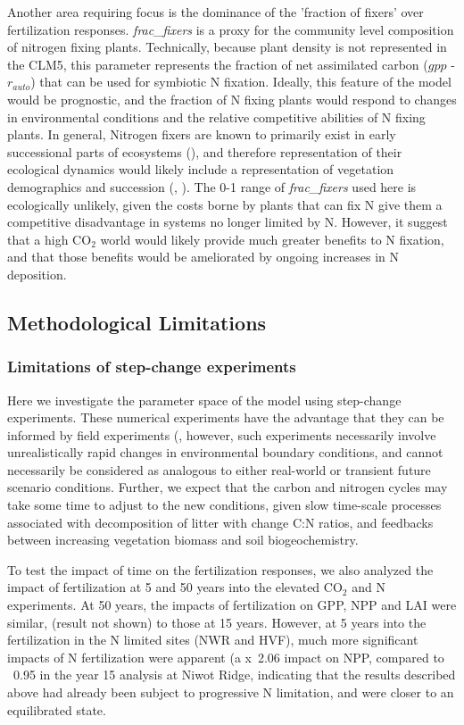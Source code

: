 \usepackage{}\documentclass[draft,linenumbers]{agujournal}
\begin{document}
Another area requiring focus is the dominance of the 'fraction of fixers' over fertilization responses. \emph{frac\_fixers} is a proxy for the community level composition of nitrogen fixing plants. Technically, because plant density is not represented in the CLM5, this parameter represents the fraction of net assimilated carbon ($gpp$ - $r_{auto}$) that can be used for symbiotic N fixation. Ideally, this feature of the model would be prognostic, and the fraction of N fixing plants would respond to changes in environmental conditions and the relative competitive abilities of N fixing plants. In general, Nitrogen fixers are known to primarily exist in early successional parts of ecosystems (\cite{vitousek1989}), and therefore representation of their ecological dynamics would likely include a representation of vegetation demographics and succession (\cite{fisher2018vegetation}, \cite{trugman2016climate}). The 0-1 range of \emph{frac\_fixers} used here is ecologically unlikely, given the costs borne by plants that can fix N give them a competitive disadvantage in systems no longer limited by N. However, it suggest that a high CO$_{2}$ world would likely provide much greater benefits to N fixation, and that those benefits would be ameliorated by ongoing increases in N deposition.

\subsection{ Methodological Limitations}
\subsubsection{Limitations of step-change experiments}
Here we investigate the parameter space of the model using step-change experiments. These numerical experiments have the advantage that they can be informed by field experiments (\cite{wieder2019}, however, such experiments necessarily involve unrealistically rapid changes in environmental boundary conditions, and cannot necessarily be considered as analogous to either real-world or transient future scenario conditions. Further, we expect that the carbon and nitrogen cycles may take some time to adjust to the new conditions, given slow time-scale processes associated with decomposition of litter with change C:N ratios, and feedbacks between increasing vegetation biomass and soil biogeochemistry.

To test the impact of time on the fertilization responses, we also analyzed the impact of fertilization at 5 and 50 years into the elevated CO$_{2}$ and N experiments. At 50 years, the impacts of fertilization on GPP, NPP and LAI were similar, (result not shown) to those at 15 years.  However, at 5 years into the fertilization in the N limited sites (NWR and HVF), much more significant impacts of N fertilization were apparent (a x~2.06 impact on NPP, compared to ~0.95 in the year 15 analysis at Niwot Ridge, indicating that the results described above had already been subject to progressive N limitation, and were closer to an equilibrated state.
\end{document}
